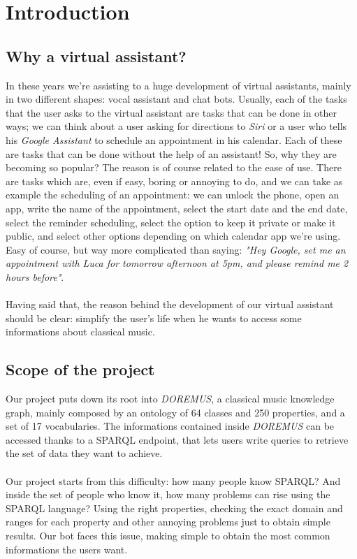 \chapter{Introduction}
	\section{Why a virtual assistant?}
	In these years we're assisting to a huge development of virtual assistants, mainly in two different shapes: vocal assistant and chat bots. Usually, each of the tasks that the user asks to the virtual assistant are tasks that can be done in other ways; we can think about a user asking for directions to \textit{Siri} or a user who tells his \textit{Google Assistant} to schedule an appointment in his calendar. Each of these are tasks that can be done without the help of an assistant! So, why they are becoming so popular? The reason is of course related to the ease of use. There are tasks which are, even if easy, boring or annoying to do, and we can take as example the scheduling of an appointment: we can unlock the phone, open an app, write the name of the appointment, select the start date and the end date, select the reminder scheduling, select the option to keep it private or make it public, and select other options depending on which calendar app we're using. Easy of course, but way more complicated than saying: \textit{"Hey Google, set me an appointment with Luca for tomorrow afternoon at 5pm, and please remind me 2 hours before"}.\\\\
	Having said that, the reason behind the development of our virtual assistant should be clear: simplify the user's life when he wants to access some informations about classical music.
	
	\section{Scope of the project}
	Our project puts down its root into \textit{DOREMUS}\cite{doremus}, a classical music knowledge graph, mainly composed by an ontology of 64 classes and 250 properties, and a set of 17 vocabularies. The informations contained inside \textit{DOREMUS} can be accessed thanks to a SPARQL endpoint, that lets users write queries to retrieve the set of data they want to achieve.\\\\
	Our project starts from this difficulty: how many people know SPARQL? And inside the set of people who know it, how many problems can rise using the SPARQL language? Using the right properties, checking the exact domain and ranges for each property and other annoying problems just to obtain simple results. Our bot faces this issue, making simple to obtain the most common informations the users want.
	
